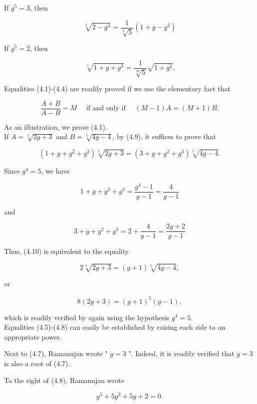 \documentclass[11pt,letterpaper]{article}
\begin{document}
If $g^{5}=3$, then


\begin{equation*}
\sqrt[3]{2-g^{3}}=\frac{1}{\sqrt[3]{5}}\left(1+g-g^{2}\right) \tag{4.7}\label{eq:4.7}
\end{equation*}


If $g^{5}=2$, then


\begin{equation*}
\sqrt[5]{1+g+g^{3}}=\frac{1}{\sqrt[10]{5}} \sqrt{1+g^{2}} . \tag{4.8}\label{eq:4.8}
\end{equation*}


Equalities (4.1)-(4.4) are readily proved if we use the elementary fact that


\begin{equation*}
\frac{A+B}{A-B}=M \quad \text { if and only if } \quad(M-1) A=(M+1) B . \tag{4.9}\label{eq:4.9}
\end{equation*}


As an illustration, we prove (4.1).\\
If $A=\sqrt[5]{2 g+3}$ and $B=\sqrt[5]{4 g-4}$, by (4.9), it suffices to prove that


\begin{equation*}
\left(1+g+g^{2}+g^{3}\right) \sqrt[5]{2 g+3}=\left(3+g+g^{2}+g^{3}\right) \sqrt[5]{4 g-4} . \tag{4.10}\label{eq:4.10}
\end{equation*}


Since $g^{4}=5$, we have

\[
1+g+g^{2}+g^{3}=\frac{g^{4}-1}{g-1}=\frac{4}{g-1}
\]

and

\[
3+g+g^{2}+g^{3}=2+\frac{4}{g-1}=\frac{2 g+2}{g-1}
\]

Thus, (4.10) is equivalent to the equality

\[
2 \sqrt[5]{2 g+3}=(g+1) \sqrt[5]{4 g-4},
\]

or

\[
8(2 g+3)=(g+1)^{5}(g-1),
\]

which is readily verified by again using the hypothesis $g^{4}=5$.\\
Equalities (4.5)-(4.8) can easily be established by raising each side to an appropriate power.

Next to (4.7), Ramanujan wrote " $g=3$ ". Indeed, it is readily verified that $g=3$ is also a root of (4.7).

To the right of (4.8), Ramanujan wrote


\begin{equation*}
g^{5}+5 g^{3}+5 g+2=0 . \tag{4.11}\label{eq:4.11}
\end{equation*}
\end{document}
